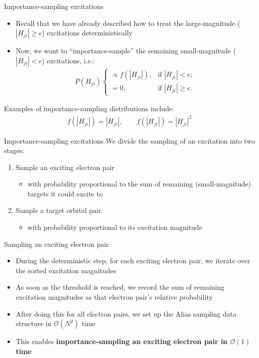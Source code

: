 \documentclass[amsmath]{beamer}
\begin{document}
\begin{frame}{Importance-sampling excitations}
	\begin{itemize}
	\item Recall that we have already described how to treat the large-magnitude ($|H_{ji}|\ge \epsilon$) excitations deterministically
	\item Now, we want to ``importance-sample'' the remaining small-magnitude ($|H_{ji}|<\epsilon$) excitations, i.e.:
	\begin{eqnarray}
		P(H_{ji}) \begin{cases}
			\propto  f(|H_{ji}|),&\textrm{if $|H_{ji}| < \epsilon$};\\
			=  0, &\textrm{if $|H_{ji}|\ge\epsilon$}. %
		\end{cases}
	\end{eqnarray}
	\end{itemize}
	Examples of importance-sampling distributions include: \begin{eqnarray}f(|H_{ji}|) = |H_{ji}|,\quad \quad f(|H_{ji}|) = |H_{ji}|^2\end{eqnarray}
\end{frame}

\begin{frame}{Importance-sampling excitations}
	We divide the sampling of an excitation into two stages:
	\begin{enumerate}
		\item Sample an exciting electron pair
			\begin{itemize}
				\item with probability proportional to the sum of remaining (small-magnitude) targets it could excite to
			\end{itemize}
		\item Sample a target orbital pair
		\begin{itemize}
			\item with probability proportional to its excitation magnitude
		\end{itemize}
	\end{enumerate}
\end{frame}

\begin{frame}{Sampling an exciting electron pair}
	\begin{itemize}
		\item During the deterministic step, for each exciting electron pair, we iterate over the sorted excitation magnitudes
		\item As soon as the threshold is reached, we record the sum of remaining excitation magnitudes as that electron pair's relative probability
		\item After doing this for all electron pairs, we set up the Alias sampling data structure in $\mathcal{O}(N^2)$ time
		\item This enables \textbf{importance-sampling an exciting electron pair in $\mathcal{O}(1)$ time}
	\end{itemize}
\end{frame}
\end{document}
